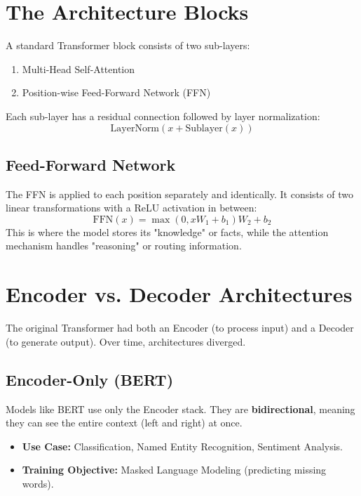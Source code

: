 \section{The Architecture Blocks}

A standard Transformer block consists of two sub-layers:
\begin{enumerate}
    \item Multi-Head Self-Attention
    \item Position-wise Feed-Forward Network (FFN)
\end{enumerate}
Each sub-layer has a residual connection followed by layer normalization:
\begin{equation}
    \text{LayerNorm}(x + \text{Sublayer}(x))
\end{equation}

\subsection{Feed-Forward Network}
The FFN is applied to each position separately and identically. It consists of two linear transformations with a ReLU activation in between:
\begin{equation}
    \text{FFN}(x) = \max(0, xW_1 + b_1)W_2 + b_2
\end{equation}
This is where the model stores its "knowledge" or facts, while the attention mechanism handles "reasoning" or routing information.

\section{Encoder vs. Decoder Architectures}

The original Transformer had both an Encoder (to process input) and a Decoder (to generate output). Over time, architectures diverged.

\subsection{Encoder-Only (BERT)}
Models like BERT \cite{devlin2018bert} use only the Encoder stack. They are \textbf{bidirectional}, meaning they can see the entire context (left and right) at once.
\begin{itemize}
    \item \textbf{Use Case:} Classification, Named Entity Recognition, Sentiment Analysis.
    \item \textbf{Training Objective:} Masked Language Modeling (predicting missing words).
\end{itemize}


